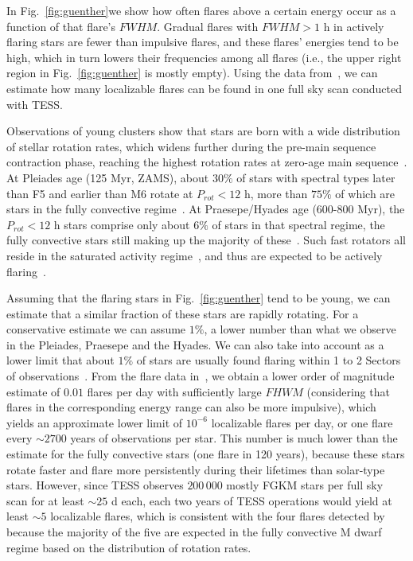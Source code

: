\documentclass[proof]{WileyASNA-v1}
\newcommand{\jdag}[1]{\textcolor{darkred}{#1}}
\begin{document}
In Fig.~\ref{fig:guenther}we show how often flares above a certain energy occur as a function of that flare's $FWHM$. Gradual flares with $FWHM > 1$ h in actively flaring stars are fewer than impulsive flares, and these flares' energies tend to be high, which in turn lowers their frequencies among all flares (i.e., the upper right region in Fig.~\ref{fig:guenther} is mostly empty). Using the data from~\citet{guenther2020}, we can estimate how many localizable flares can be found in one full sky scan conducted with TESS.

Observations of young clusters show that stars are born with a wide distribution of stellar rotation rates, which widens further during the pre-main sequence contraction phase, reaching the highest rotation rates at zero-age main sequence~\citep[ZAMS,][and references therein]{johnstone2021}. %
At Pleiades age (125 Myr, ZAMS), about $30\%$ of stars with spectral types later than F5 and earlier than M6 rotate at $P_{rot}<12$ h, more than $75\%$ of which are stars in the fully convective regime~\citep{rebull2016}. 
At Praesepe/Hyades age (600-800 Myr), the $P_{rot}<12$ h stars comprise only about $6\%$ of stars in that spectral regime, the fully convective stars still making up the majority of these~\citep{douglas2019}.
Such fast rotators all reside in the saturated activity regime~\citep{wright2011,wright2018,newton2017}, and thus are expected to be actively flaring~\citep{doorsselaere2017, clarke2018}.%

Assuming that the flaring stars in Fig.~\ref{fig:guenther} tend to be young, we can estimate that a similar fraction of these stars are rapidly rotating. For a conservative estimate we can assume $1\%$, a lower number than what we observe in the Pleiades, Praesepe and the Hyades. We can also take into account as a lower limit that about $1\%$ of stars are usually found flaring within 1 to 2 Sectors of observations~\citep{tu2021, guenther2020}. From the flare data in~\citet{guenther2020}, we obtain a lower order of magnitude estimate of $0.01$ flares per day with sufficiently large $FHWM$ (considering that flares in the corresponding energy range can also be more impulsive), which yields an approximate lower limit of $10^{-6}$ localizable flares per day, or one flare every $\sim2 700$ years of observations per star. This number is much lower than the estimate for the fully convective stars (one flare in 120 years), because these stars rotate faster and flare more persistently during their lifetimes than solar-type stars. However, since TESS observes $200\,000$ mostly FGKM stars per full sky scan for at least $\sim 25$ d each, each two years of TESS operations would yield at least $\sim 5$ localizable flares, which is consistent with the four flares detected by \citet{ilin2021b} because the majority of the five are expected in the fully convective M dwarf regime based on the distribution of rotation rates. 
\end{document}

